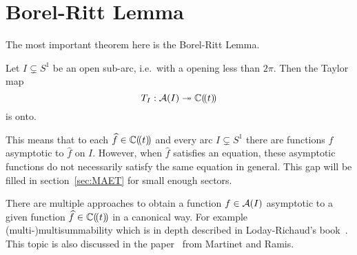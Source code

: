 \section{Borel-Ritt Lemma}
\begin{comment}
  \begin{itemize}
    \item \cite[Lem.II.2.2.5]{sabbah_cimpa90}: $T_I$
    \item \textbf{\cite[Th.7.3]{van2003galois}}: $T_I=T_{(a,b)}$
    \item \cite[Th.2.4.1]{Loday2014}: $T_{\mathfrak{s}}$
    \item \cite[4.4.Thm.16]{Balser2000Formal}
    \item \cite[XI-1-13]{hsieh2012basic}
  \end{itemize}
\end{comment}
The most important theorem here is the Borel-Ritt Lemma.
\begin{thm}\label{thm:borel-ritt}
  Let $I\subsetneq S^1$ be an open sub-arc, i.e.\ with a opening less than
  $2\pi$. Then the Taylor map
  \[
    T_{I}:\mathcal{A}(I)\twoheadrightarrow\mathbb{C}(\!(t)\!)
  \]
  is onto.
  \begin{s-rem}
    This means that to each $\widehat f\in\mathbb{C}(\!(t)\!)$ and every arc
    $I\subsetneq S^1$ there are functions $f$
    asymptotic to $\hat f$ on $I$.
    However, when $\hat f$ satisfies an equation, these asymptotic functions do
    not necessarily satisfy the same equation in general.
    This gap will be filled in section~\ref{sec:MAET} for small enough sectors.
  \end{s-rem}
\end{thm}
There are multiple approaches to obtain a function $f\in\mathcal{A}(I)$ asymptotic to a
given function $\widehat f\in\mathbb{C}(\!(t)\!)$ in a canonical way. For example
(multi-)multisummability which is in depth described in Loday-Richaud's
book~\cite{Loday2014}.
This topic is also discussed in the paper~\cite{Martinet1991} from Martinet and
Ramis.
